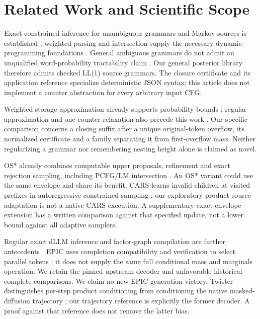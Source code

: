 \documentclass[12pt]{article}
\theoremstyle{readable}
\begin{document}
\section{Related Work and Scientific Scope}

Exact constrained inference for unambiguous grammars and Markov sources is
established \cite{rivaud2017sampling}; weighted parsing and intersection supply
the necessary dynamic-programming foundations \cite{goodman1999semiring,
nederhof2003intersection}. General ambiguous grammars do not admit an
unqualified word-probability tractability claim \cite{amarilli2026probabilistic}.
Our general posterior library therefore admits checked LL(1) source grammars.
The closure certificate and its application reference specialize deterministic
JSON syntax; this article does not implement a counter abstraction for every
arbitrary input CFG.

Weighted storage approximation already supports probability bounds
\cite{denkinger2017storage}; regular approximation and one-counter relaxation
also precede this work \cite{mohri2001regular,sakharov2017counter}. Our specific
comparison concerns a closing suffix after a unique original-token overflow,
its normalized certificate and a family separating it from first-overflow
mass. Neither regularizing a grammar nor remembering nesting height alone is
claimed as novel.

OS* already combines computable upper proposals, refinement and exact rejection
sampling, including PCFG/LM intersection \cite{dymetman2012os}. An OS* variant
could use the same envelope and share its benefit. CARS learns invalid children
at visited prefixes in autoregressive constrained sampling \cite{parys2025cars};
our exploratory product-source adaptation is not a native CARS execution.
A supplementary exact-envelope extension has a written comparison against
that specified update, not a lower bound against all adaptive samplers.

Regular exact dLLM inference and factor-graph compilation are further
antecedents \cite{dang2026automata,su2026factor}. EPIC uses completion
compatibility and verification to select parallel tokens \cite{jin2026epic};
it does not supply the same full conditional mass and marginals operation.
We retain the pinned upstream decoder and unfavorable historical complete
comparisons. We claim no new EPIC generation victory. Twister distinguishes
per-step product conditioning from conditioning the native masked-diffusion
trajectory \cite{thimmaiah2026twister}; our trajectory reference is explicitly
the former decoder. A proof against that reference does not remove the latter
bias.
\end{document}
